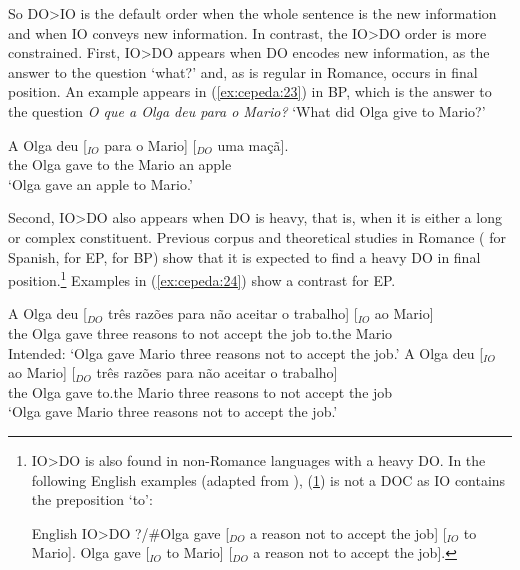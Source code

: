 \documentclass[output=paper,colorlinks,citecolor=brown]{./langscibook}
\begin{document}
So DO>IO is the default order when the whole sentence is the new information and when IO conveys new information. In contrast, the IO>DO order is more constrained. First, IO>DO appears when DO encodes new information, as the answer to the question ‘what?’ and, as is regular in Romance, occurs in final position. An example appears in (\ref{ex:cepeda:23}) in BP, which is the answer to the question \textit{O que a Olga deu para o Mario?} ‘What did Olga give to Mario?’

\ea%
    \label{ex:cepeda:23}
	\gll A   Olga deu [$_{IO}$ para o   Mario] [$_{DO}$ uma maçã].\\
		the Olga gave \hspaceThis{[$_{IO}$} to the Mario  \hspaceThis{[$_{DO}$} an apple\\
	\glt ‘Olga gave an apple to Mario.’
\z

Second, IO>DO also appears when DO is heavy, that is, when it is either a long or complex constituent. Previous corpus and theoretical studies in Romance (\citealt{BeaversNishida2010} for Spanish, \citealt{Brito2014} for EP, \citealt{Mioto2003} for BP) show that it is expected to find a heavy DO in final position.\footnote{IO>DO is also found in non-Romance languages with a heavy DO. In the following English examples (adapted from \citealt{Larson2014}), (\ref{ex:cepeda:ib}) is not a DOC as IO contains the preposition ‘to’:

\ea%
    \label{ex:cepeda:i}
    English IO>DO
	\ea\label{ex:cepeda:ia} {?/\#}Olga gave [$_{DO}$ a reason not to accept the job] [$_{IO}$ to Mario].
	\ex\label{ex:cepeda:ib} Olga gave [$_{IO}$ to Mario] [$_{DO}$ a reason not to accept the job].
	\z
\z
} Examples in (\ref{ex:cepeda:24}) show a contrast for EP.

\ea%
    \label{ex:cepeda:24}
	\ea\label{ex:cepeda:24a}
	A Olga deu [$_{DO}$  três razões para não aceitar o trabalho] [$_{IO}$ ao Mario]\\
		the Olga gave \hspaceThis{[$_{DO}$} three reasons to not accept the job \hspaceThis{[$_{IO}$} to.the Mario\\
	\glt Intended: ‘Olga gave Mario three reasons not to accept the job.’
	\ex\label{ex:cepeda:24b}
	\gll A Olga deu [$_{IO}$ ao Mario] [$_{DO}$ três razões para não aceitar o trabalho]\\
		the Olga gave \hspaceThis{[$_{IO}$} to.the Mario \hspaceThis{[$_{DO}$} three reasons to not accept the job\\
	\glt ‘Olga gave Mario three reasons not to accept the job.’
	\z
\z
\end{document}
